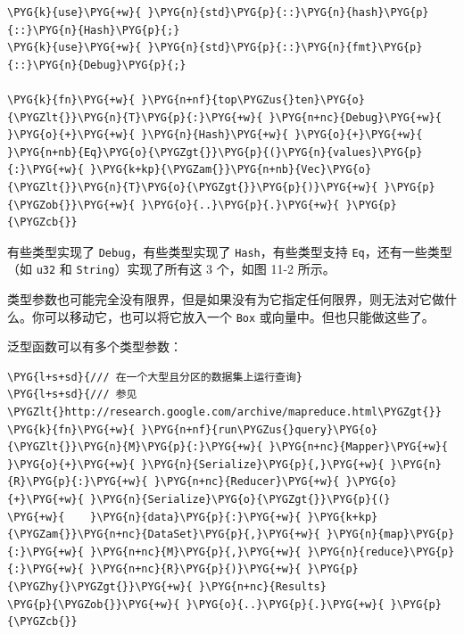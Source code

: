 \begin{Verbatim}[commandchars=\\\{\},breaklines=true,breakanywhere=true,fontsize=\codefont,xleftmargin=17bp]
\PYG{k}{use}\PYG{+w}{ }\PYG{n}{std}\PYG{p}{::}\PYG{n}{hash}\PYG{p}{::}\PYG{n}{Hash}\PYG{p}{;}
\PYG{k}{use}\PYG{+w}{ }\PYG{n}{std}\PYG{p}{::}\PYG{n}{fmt}\PYG{p}{::}\PYG{n}{Debug}\PYG{p}{;}

\PYG{k}{fn}\PYG{+w}{ }\PYG{n+nf}{top\PYGZus{}ten}\PYG{o}{\PYGZlt{}}\PYG{n}{T}\PYG{p}{:}\PYG{+w}{ }\PYG{n+nc}{Debug}\PYG{+w}{ }\PYG{o}{+}\PYG{+w}{ }\PYG{n}{Hash}\PYG{+w}{ }\PYG{o}{+}\PYG{+w}{ }\PYG{n+nb}{Eq}\PYG{o}{\PYGZgt{}}\PYG{p}{(}\PYG{n}{values}\PYG{p}{:}\PYG{+w}{ }\PYG{k+kp}{\PYGZam{}}\PYG{n+nb}{Vec}\PYG{o}{\PYGZlt{}}\PYG{n}{T}\PYG{o}{\PYGZgt{}}\PYG{p}{)}\PYG{+w}{ }\PYG{p}{\PYGZob{}}\PYG{+w}{ }\PYG{o}{..}\PYG{p}{.}\PYG{+w}{ }\PYG{p}{\PYGZcb{}}
\end{Verbatim}

有些类型实现了 \texttt{Debug}，有些类型实现了 \texttt{Hash}，有些类型支持 \texttt{Eq}，还有一些类型（如 \texttt{u32} 和 \texttt{String}）实现了所有这 3 个，如图 11-2 所示。


类型参数也可能完全没有限界，但是如果没有为它指定任何限界，则无法对它做什么。你可以移动它，也可以将它放入一个 \texttt{Box} 或向量中。但也只能做这些了。

泛型函数可以有多个类型参数：

\begin{Verbatim}[commandchars=\\\{\},breaklines=true,breakanywhere=true,fontsize=\codefont,xleftmargin=17bp]
\PYG{l+s+sd}{/// 在一个大型且分区的数据集上运行查询}
\PYG{l+s+sd}{/// 参见\PYGZlt{}http://research.google.com/archive/mapreduce.html\PYGZgt{}}
\PYG{k}{fn}\PYG{+w}{ }\PYG{n+nf}{run\PYGZus{}query}\PYG{o}{\PYGZlt{}}\PYG{n}{M}\PYG{p}{:}\PYG{+w}{ }\PYG{n+nc}{Mapper}\PYG{+w}{ }\PYG{o}{+}\PYG{+w}{ }\PYG{n}{Serialize}\PYG{p}{,}\PYG{+w}{ }\PYG{n}{R}\PYG{p}{:}\PYG{+w}{ }\PYG{n+nc}{Reducer}\PYG{+w}{ }\PYG{o}{+}\PYG{+w}{ }\PYG{n}{Serialize}\PYG{o}{\PYGZgt{}}\PYG{p}{(}
\PYG{+w}{    }\PYG{n}{data}\PYG{p}{:}\PYG{+w}{ }\PYG{k+kp}{\PYGZam{}}\PYG{n+nc}{DataSet}\PYG{p}{,}\PYG{+w}{ }\PYG{n}{map}\PYG{p}{:}\PYG{+w}{ }\PYG{n+nc}{M}\PYG{p}{,}\PYG{+w}{ }\PYG{n}{reduce}\PYG{p}{:}\PYG{+w}{ }\PYG{n+nc}{R}\PYG{p}{)}\PYG{+w}{ }\PYG{p}{\PYGZhy{}\PYGZgt{}}\PYG{+w}{ }\PYG{n+nc}{Results}
\PYG{p}{\PYGZob{}}\PYG{+w}{ }\PYG{o}{..}\PYG{p}{.}\PYG{+w}{ }\PYG{p}{\PYGZcb{}}
\end{Verbatim}

